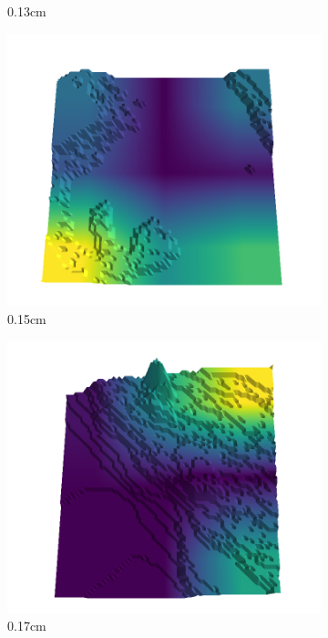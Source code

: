 \begin{figure}[H]
\begin{subfigure}[b]{0.192\linewidth}
    \caption{0.13cm}
    \label{fig : quarry-worst-17}
    \end{subfigure}
    \begin{subfigure}[b]{0.192\linewidth}
    \includegraphics[width=\linewidth]{../img/5/quarry/worst/15-patch-3d-majavi-colormap-180.png}
    \caption{0.15cm}
    \label{fig : quarry-worst-18}
    \end{subfigure}
    \begin{subfigure}[b]{0.192\linewidth}
    \includegraphics[width=\linewidth]{../img/5/quarry/worst/17-patch-3d-majavi-colormap-190.png}
    \caption{0.17cm}
    \label{fig : quarry-worst-19}
    \end{subfigure}
    \caption{}
    \label{fig : quarry-worst}
    \end{figure}

